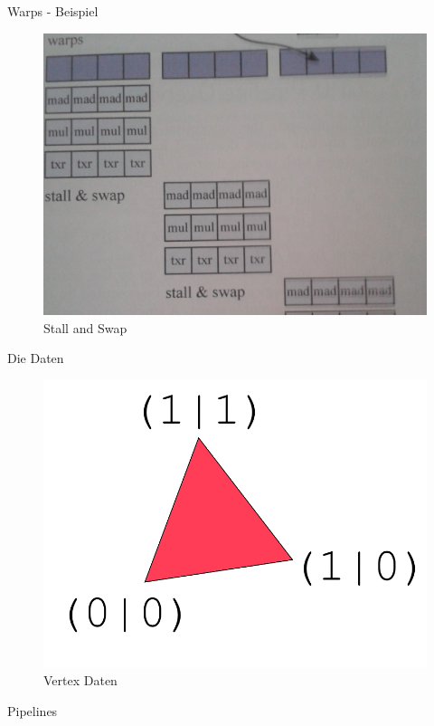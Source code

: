 \documentclass[11pt]{beamer}
\begin{document}
\begin{frame}{Warps - Beispiel}
    \begin{figure}[hbtp]
        \centering
        \includegraphics[scale=.14]{swap.png}
        \caption{Stall and Swap}
    \end{figure}
\end{frame}

\begin{frame}{Die Daten}
    \begin{figure}[hbtp]
        \centering
        \includegraphics[scale=.4]{data.png}
        \caption{Vertex Daten}
    \end{figure}
\end{frame}

\begin{frame}{Pipelines}
\end{frame}
\end{document}
